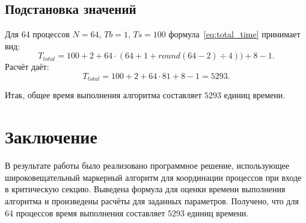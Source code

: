 \documentclass[openany, twoside, a4paper, 12pt]{extbook}
\begin{document}
\subsection*{Подстановка значений}
Для 64 процессов $N = 64$, $Tb = 1$, $Ts = 100$ формула~\ref{eq:total_time} принимает вид:
\[
	T_{total} = 100 + 2 + 64 \cdot (64 + 1 + round(64 - 2) \div 4) ) + 8 - 1.
\]
Расчёт даёт:
\[
T_{total} = 100 + 2 + 64 \cdot 81 + 8 - 1 = 5293.
\]

Итак, общее время выполнения алгоритма составляет $5293$ единиц времени.

\section*{Заключение}
В результате работы было реализовано программное решение,
использующее широковещательный маркерный алгоритм для координации процессов
при входе в критическую секцию. Выведена формула для оценки времени выполнения алгоритма и 
произведены расчёты для заданных параметров.
Получено, что для 64 процессов время выполнения составляет $5293$ единиц времени.
\end{document}

